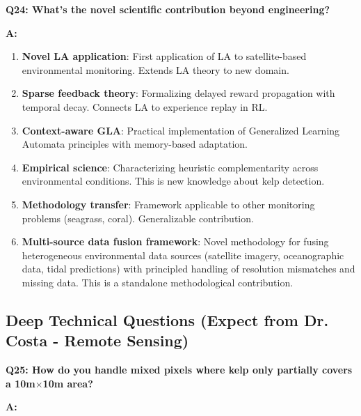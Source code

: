 \documentclass[11pt]{article}
\begin{document}
\textbf{Q24: What's the novel scientific contribution beyond engineering?}

\textbf{A:}

\begin{enumerate}
    \item \textbf{Novel LA application}: First application of LA to satellite-based environmental monitoring. Extends LA theory to new domain.

    \item \textbf{Sparse feedback theory}: Formalizing delayed reward propagation with temporal decay. Connects LA to experience replay in RL.

    \item \textbf{Context-aware GLA}: Practical implementation of Generalized Learning Automata principles with memory-based adaptation.

    \item \textbf{Empirical science}: Characterizing heuristic complementarity across environmental conditions. This is new knowledge about kelp detection.

    \item \textbf{Methodology transfer}: Framework applicable to other monitoring problems (seagrass, coral). Generalizable contribution.

    \item \textbf{Multi-source data fusion framework}: Novel methodology for fusing heterogeneous environmental data sources (satellite imagery, oceanographic data, tidal predictions) with principled handling of resolution mismatches and missing data. This is a standalone methodological contribution.
\end{enumerate}

\subsection{Deep Technical Questions (Expect from Dr. Costa - Remote Sensing)}

\textbf{Q25: How do you handle mixed pixels where kelp only partially covers a 10m$\times$10m area?}

\textbf{A:}
\end{document}
